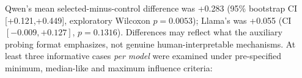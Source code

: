 \documentclass[11pt]{article}
\begin{document}
\begin{table}[t]\centering\footnotesize
{}
\caption{Descriptive evidence-selection faithfulness diagnostics; $n=40$, Wilcoxon exploratory.}\label{tab:interp}
\end{table}

Qwen's mean selected-minus-control difference was +0.283 (95\% bootstrap CI [+0.121,+0.449], exploratory Wilcoxon $p=0.0053$); Llama's was +0.055 (CI $[-0.009,+0.127]$, $p=0.1316$). Differences may reflect what the auxiliary probing format emphasizes, not genuine human-interpretable mechanisms. At least three informative cases \emph{per model} were examined under pre-specified minimum, median-like and maximum influence criteria:
\end{document}
